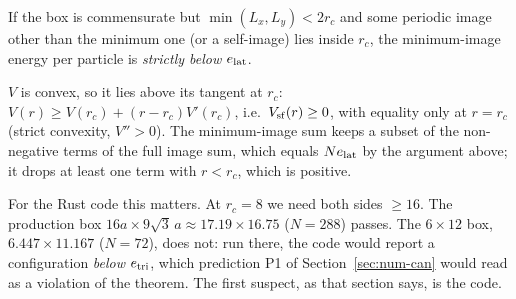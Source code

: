\begin{corollary}\label{fss:cor:small}
\tierC{} If the box is commensurate but $\min(L_x,L_y)<2r_c$ and some periodic image other than the minimum one (or a
self-image) lies inside $r_c$, the minimum-image energy per particle is \emph{strictly below} $e_{\rm lat}$.
\end{corollary}
\begin{humanproof}
$V$ is convex, so it lies above its tangent at $r_c$: $V(r)\ge V(r_c)+(r-r_c)V'(r_c)$, i.e.\ $V_{\rm sf}(r)\ge0$, with
equality only at $r=r_c$ (strict convexity, $V''>0$). The minimum-image sum keeps a subset of the non-negative terms of
the full image sum, which equals $Ne_{\rm lat}$ by the argument above; it drops at least one term with $r<r_c$, which is
positive.
\end{humanproof}

For the Rust code this matters. At $r_c=8$ we need both sides $\ge16$. The production box $16a\times9\sqrt3\,a\approx
17.19\times16.75$ ($N=288$) passes. The $6\times12$ box, $6.447\times11.167$ ($N=72$), does not: run there, the code
would report a configuration \emph{below} $e_{\rm tri}$, which prediction P1 of Section~\ref{sec:num-can} would read as a
violation of the theorem. The first suspect, as that section says, is the code.

